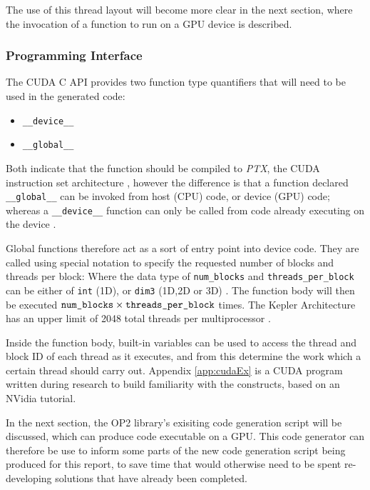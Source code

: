 \noindent The use of this thread layout will become more clear in the next section, where the invocation of a function to run on a GPU device is described.

\subsubsection{Programming Interface}
The CUDA C API provides two function type quantifiers that will need to be used in the generated code:
\begin{itemize}
\vspace{-.5cm}
\setlength{\itemsep}{0pt}%
\setlength{\parskip}{0pt}%
\item{\verb|__device__|}
\item{\verb|__global__|}
\vspace{-.5cm}
\end{itemize}
Both indicate that the function should be compiled to \textit{PTX}, the CUDA instruction set architecture \cite[p15]{guide}, however the difference is that a function declared \verb|__global__| can be invoked from host (CPU) code,  or device (GPU) code; whereas a \verb|__device__| function can only be called from code already executing on the device \cite[p81]{guide}.
\par
Global functions therefore act as a sort of entry point into device code. They are called using special notation to specify the requested number of blocks and threads per block:
\noindent Where the data type of \verb|num_blocks| and \verb|threads_per_block| can be either of \verb|int| (1D), or \verb|dim3| (1D,2D or 3D) \cite[p9]{guide}. The function body will then be executed $\verb|num_blocks| \times  \verb|threads_per_block|$ times. The Kepler Architecture has an upper limit of 2048 total threads per multiprocessor \cite{kepler}.
\par
Inside the function body, built-in variables can be used to access the thread and block ID of each thread as it executes, and from this determine the work which a certain thread should carry out. Appendix \ref{app:cudaEx} is a CUDA program written during research to build familiarity with the constructs, based on an NVidia tutorial.
\par
In the next section, the OP2 library's exisiting code generation script will be discussed, which can produce code executable on a GPU. This code generator can therefore be use to inform some parts of the new code generation script being produced for this report, to save time that would otherwise need to be spent re-developing solutions that have already been completed.

